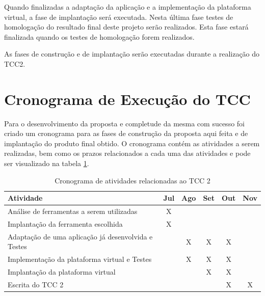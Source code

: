 Quando finalizadas a adaptação da aplicação e a implementação da plataforma virtual, a fase de implantação será executada. Nesta última fase testes de homologação do resultado final deste projeto serão realizados. Esta fase estará finalizada quando os testes de homologação forem realizados.

As fases de construção e de implantação serão executadas durante a realização do TCC2.

\section{Cronograma de Execução do TCC}
Para o desenvolvimento da proposta e completude da mesma com sucesso foi criado um cronograma para as fases de construção da proposta aqui feita e de implantação do produto final obtido. O cronograma contém as atividades a serem realizadas, bem como os prazos relacionados a cada uma das atividades e pode ser visualizado na tabela \ref{cronograma_tcc2}.

\begin{table}[!h]
\centering
\caption{Cronograma de atividades relacionadas ao TCC 2}
\label{cronograma_tcc2}
\begin{tabular}{|p{9cm}|c|c|c|c|c|}
\hline
Atividade                                                   & \multicolumn{1}{l|}{Jul} & \multicolumn{1}{l|}{Ago} & \multicolumn{1}{l|}{Set} & \multicolumn{1}{l|}{Out} & \multicolumn{1}{l|}{Nov} \\ \hline
Análise de ferramentas a serem utilizadas                   & X                           &                             &                              &                            &                             \\ \hline
Implantação da ferramenta escolhida                         & X                           &                             &                              &                            &                             \\ \hline
Adaptação de uma aplicação já desenvolvida e Testes         &                             & X                              & X                            & X                          &                              \\ \hline
Implementação da plataforma virtual e Testes                &                             & X                          & X                            & X                          &                             \\ \hline
Implantação da plataforma virtual                           &                             &                            & X                          & X                            &                             \\ \hline
Escrita do TCC 2                                            &                             &                             &                            & X                            & X                           \\ \hline
\end{tabular}
\end{table}


